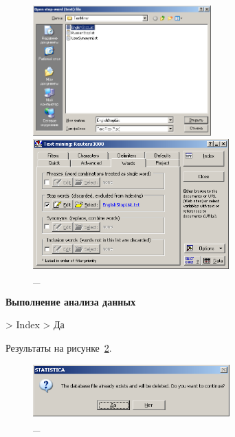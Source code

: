 \begin{figure}[!h]
  \centering

  \begin{minipage}{0.49\textwidth}
    \centering

    \includegraphics[height=5cm]
    {inc/7.PNG}

    \caption{\_}

    \label{fig:7}
  \end{minipage}
  \begin{minipage}{0.49\textwidth}
    \centering

    \includegraphics[height=5cm]
    {inc/8.PNG}

    \caption{\_}

    \label{fig:8}
  \end{minipage}
\end{figure}

\newpage

\begin{center}
  \textbf{Выполнение анализа данных}
\end{center}

> Index > Да

Результаты на рисунке~\ref{fig:9}.

\begin{figure}[!h]
  \centering

  \includegraphics[height=2cm]
  {inc/9.PNG}

  \caption{\_}

  \label{fig:9}
\end{figure}

